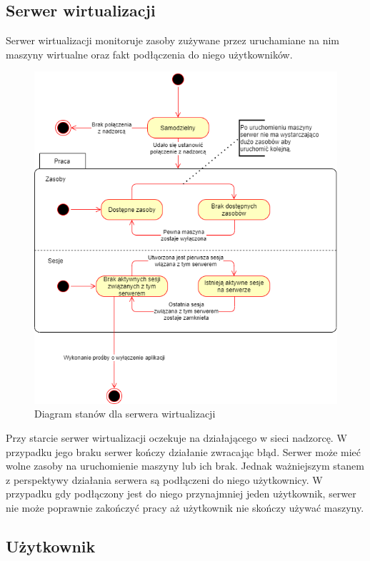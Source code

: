 \documentclass[../opis-rozwiazania.tex]{subfiles}
\begin{document}
\subsection{Serwer wirtualizacji}

Serwer wirtualizacji monitoruje zasoby zużywane przez uruchamiane na nim maszyny wirtualne oraz fakt podłączenia do niego użytkowników.

\begin{figure}[H]
  \centering
  \includegraphics[width=\textwidth]{../diagrams/state_diagrams/virtualisation_server.png}
  \caption{Diagram stanów dla serwera wirtualizacji}
  \label{state_virtsrv}
\end{figure}

Przy starcie serwer wirtualizacji oczekuje na działającego w sieci nadzorcę.
W przypadku jego braku serwer kończy działanie zwracając błąd.
Serwer może mieć wolne zasoby na uruchomienie maszyny lub ich brak.
Jednak ważniejszym stanem z perspektywy działania serwera są podłączeni do niego użytkownicy.
W przypadku gdy podłączony jest do niego przynajmniej jeden użytkownik, serwer nie może poprawnie zakończyć pracy aż użytkownik nie skończy używać maszyny.

\subsection{Użytkownik}
\end{document}
